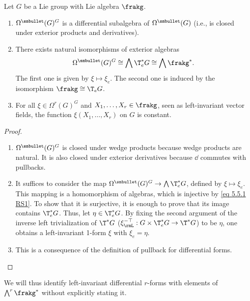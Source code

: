 \begin{prop}[{{\cite[Prop.~5.5.2]{RS1}}}]\label{prop 5.5.2 RS1}
    Let $G$ be a Lie group with Lie algebra $\frakg$.
    \begin{enumerate}
        \item $\Omega^{\smbullet }(G)^G$ is a differential subalgebra of $\Omega^{\smbullet }(G)$ (i.e., is closed under exterior products and derivatives).
        \item There exists natural isomorphisms of exterior algebras
        \[\Omega^{\smbullet }(G)^G\cong \bigwedge \T^\ast_e G\cong \bigwedge \frakg^\ast.\]
        The first one is given by $\xi\mapsto \xi_e$. The second one is induced by the isomorphism $\frakg\cong \T_eG$.
        \item For all $\xi\in\Omega^r(G)^G$ and $X_1,\ldots,X_r\in\frakg$, seen as left-invariant vector fields, the function $\xi(X_1,\ldots,X_r)$ on $G$ is constant.
    \end{enumerate}
\end{prop}
\begin{proof}
    \begin{enumerate}
        \item $\Omega^{\smbullet }(G)^G$ is closed under wedge products because wedge products are natural. It is also closed under exterior derivatives because $\dd$ commutes with pullbacks.
        \item It suffices to consider the map $\Omega^{\smbullet }(G)^G\to\bigwedge \T^\ast_e G$, defined by $\xi\mapsto\xi_e$. This mapping is a homomorphism of algebras, which is injective by \eqref{eq 5.5.1 RS1}. To show that it is surjective, it is enough to prove that its image contains $\T^\ast_e G$. Thus, let $\eta\in \T^\ast_e G$. By fixing the second argument of the inverse left trivialization of $\T^\ast G$ ($\xi_\rmL^{-\top}:G\times \T_e^\ast G\to \T^\ast G$) to be $\eta$, one obtains a left-invariant 1-form $\xi$ with $\xi_e=\eta$.
        \item  This is a consequence of the definition of pullback for differential forms.
    \end{enumerate}
\end{proof}

We will thus identify left-invariant differential $r$-forms with elements of $\bigwedge\nolimits^r\frakg^\ast$ without explicitly stating it. 


